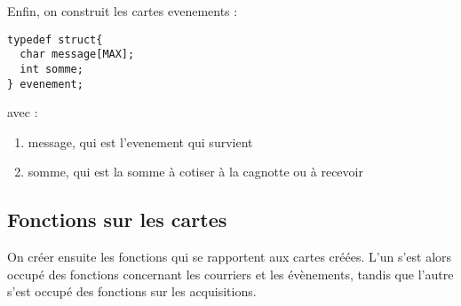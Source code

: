 \documentclass[a4paper, 11pt]{report}
\begin{document}
Enfin, on construit les cartes evenements :

\begin{verbatim}
typedef struct{
  char message[MAX];
  int somme;
} evenement;
\end{verbatim}

avec :
\begin{enumerate}
\item message, qui est l'evenement qui survient
\item somme, qui est la somme à cotiser à la cagnotte ou à recevoir
\end{enumerate}


\subsection{Fonctions sur les cartes}
On créer ensuite les fonctions qui se rapportent aux cartes créées. L'un s'est alors occupé des fonctions concernant les courriers et les évènements, tandis que l'autre s'est occupé des fonctions sur les acquisitions.
\end{document}
